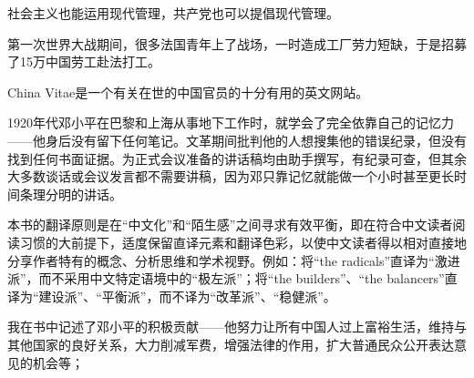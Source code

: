社会主义也能运用现代管理，共产党也可以提倡现代管理。

第一次世界大战期间，很多法国青年上了战场，一时造成工厂劳力短缺，于是招募了15万中国劳工赴法打工。

China Vitae是一个有关在世的中国官员的十分有用的英文网站。

1920年代邓小平在巴黎和上海从事地下工作时，就学会了完全依靠自己的记忆力——他身后没有留下任何笔记。文革期间批判他的人想搜集他的错误纪录，但没有找到任何书面证据。为正式会议准备的讲话稿均由助手撰写，有纪录可查，但其余大多数谈话或会议发言都不需要讲稿，因为邓只靠记忆就能做一个小时甚至更长时间条理分明的讲话。

本书的翻译原则是在“中文化”和“陌生感”之间寻求有效平衡，即在符合中文读者阅读习惯的大前提下，适度保留直译元素和翻译色彩，以使中文读者得以相对直接地分享作者特有的概念、分析思维和学术视野。例如：将“the radicals”直译为“激进派”，而不采用中文特定语境中的“极左派”；将“the builders”、“the balancers”直译为“建设派”、“平衡派”，而不译为“改革派”、“稳健派”。

我在书中记述了邓小平的积极贡献——他努力让所有中国人过上富裕生活，维持与其他国家的良好关系，大力削减军费，增强法律的作用，扩大普通民众公开表达意见的机会等；